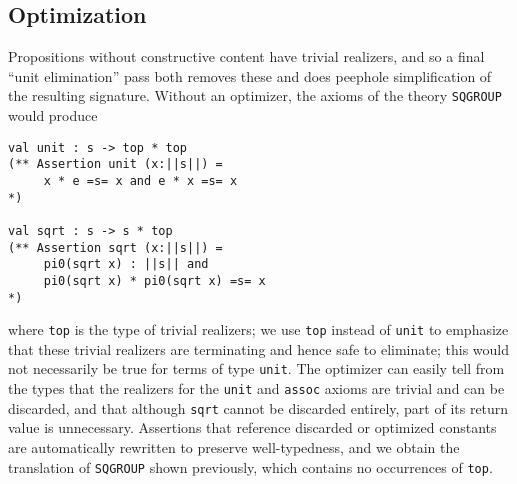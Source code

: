 \subsection{Optimization}

Propositions without constructive content have trivial realizers, and
so a final ``unit elimination'' pass both removes these and does 
peephole simplification of the resulting signature.   Without an optimizer,
the axioms of the theory \Verb|SQGROUP| would produce
\begin{Verbatim}
val unit : s -> top * top
(** Assertion unit (x:||s||) =  
     x * e =s= x and e * x =s= x
*)

val sqrt : s -> s * top
(** Assertion sqrt (x:||s||) =  
     pi0(sqrt x) : ||s|| and 
     pi0(sqrt x) * pi0(sqrt x) =s= x
*)
\end{Verbatim}
where \Verb|top| is the type of trivial realizers; we use 
\Verb|top| instead of \Verb|unit| to emphasize that these trivial realizers are terminating and hence safe to eliminate; this would not necessarily
be true for terms of type \Verb|unit|.  The optimizer can
easily tell from the types that the realizers for the \Verb|unit| and
\Verb|assoc| axioms are trivial and can be discarded, and that
although \Verb|sqrt| cannot be discarded entirely, part of its return
value is unnecessary.  Assertions that reference discarded or optimized
constants are automatically rewritten to preserve well-typedness, and we obtain the translation of \Verb|SQGROUP| shown previously, which contains no
occurrences of \Verb|top|.


